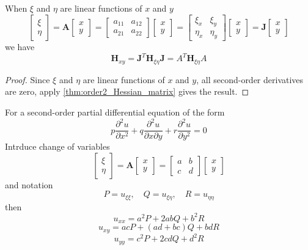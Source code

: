 \documentclass[a4]{overview}
\begin{document}
\begin{theorem}
	\label{thm:linear_transformation_Hessian_matrix}
	When $\xi$ and $\eta$ are linear functions of $x$ and $y$
\[
\begin{bmatrix} \xi\\ \eta \end{bmatrix}
= \boldsymbol{A} \begin{bmatrix} x\\ y \end{bmatrix}
= \begin{bmatrix} a_{11} & a_{12}\\ a_{21} & a_{22} \end{bmatrix}
\begin{bmatrix} x\\ y \end{bmatrix}
=
\begin{bmatrix} \xi_x & \xi_y\\ \eta_x & \eta_y \end{bmatrix}
\begin{bmatrix} x\\ y \end{bmatrix}
= \boldsymbol{J} \begin{bmatrix} x\\ y \end{bmatrix}
\]
we have
\[
	\boldsymbol{H}_{xy} = \boldsymbol{J}^T \boldsymbol{H}_{\xi\eta} \boldsymbol{J}
	= A^T \boldsymbol{H}_{\xi\eta} A
\] 
\end{theorem}
\begin{proof}
	Since $\xi$ and $\eta$ are linear functions of $x$ and $y$, all second-order
	derivatives are zero, apply \ref{thm:order2_Hessian_matrix} gives the result.
\end{proof}

\begin{theorem}
For a second-order partial differential equation of the form
\[
	p\frac{\partial^2 u}{\partial x^2}
	+ q\frac{\partial^2 u}{\partial x\partial y}
	+ r\frac{\partial^2 u}{\partial y^2}
	=0
\] 
Intrduce change of variables
\[
\begin{bmatrix} \xi\\ \eta \end{bmatrix}
= \boldsymbol{A} \begin{bmatrix} x\\ y \end{bmatrix}
= \begin{bmatrix} a & b\\ c & d \end{bmatrix}
\begin{bmatrix} x\\ y \end{bmatrix}
\] 
and notation
\[
	P = u_{\xi\xi},\quad Q = u_{\xi\eta},\quad R = u_{\eta\eta}
\] 
then
\[
	u_{xx} = a^2 P + 2ab Q + b^2 R
\] 
\[
	u_{xy} = ac P + (ad+bc) Q + bd R
\] 
\[
	u_{yy} = c^2 P + 2cd Q + d^2 R
\]

\end{theorem}
\end{document}

